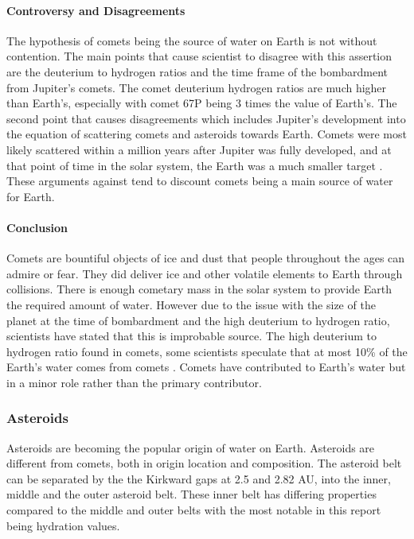 \paragraph{Controversy and Disagreements}
The hypothesis of comets being the source of water on Earth is not without contention. The main points that cause scientist to disagree with this assertion are the deuterium to hydrogen ratios and the time frame of the bombardment from Jupiter's comets.
The comet deuterium hydrogen ratios are much higher than Earth's, especially with comet 67P being 3 times the value of Earth's. 
The second point that causes disagreements which includes Jupiter's development into the equation of scattering comets and asteroids towards Earth. Comets were most likely scattered within a million years after Jupiter was fully developed, and at that point of time in the solar system, the Earth was a much smaller target \cite{morbidelli2000source}. 
These arguments against tend to discount comets being a main source of water for Earth.

\paragraph{Conclusion}
Comets are bountiful objects of ice and dust that people throughout the ages can admire or fear. They did deliver ice and other volatile elements to Earth through collisions.
There is enough cometary mass in the solar system to provide Earth the required amount of water. 
However due to the issue with the size of the planet at the time of bombardment and the high deuterium to hydrogen ratio, scientists have stated that this is improbable source.
The high deuterium to hydrogen ratio found in comets, some scientists speculate that at most 10\% of the Earth's water comes from comets \cite{morbidelli2000source}.
Comets have contributed to Earth's water but in a minor role rather than the primary contributor.

\subsubsection{Asteroids}
Asteroids are becoming the popular origin of water on Earth.
Asteroids are different from comets, both in origin location and composition.
The asteroid belt can be separated by the the Kirkward gaps at 2.5 and 2.82 AU\cite{AsteroidBelt}, into the inner, middle and the outer asteroid belt.
These inner belt has differing properties compared to the middle and outer belts with the most notable in this report being hydration values.

